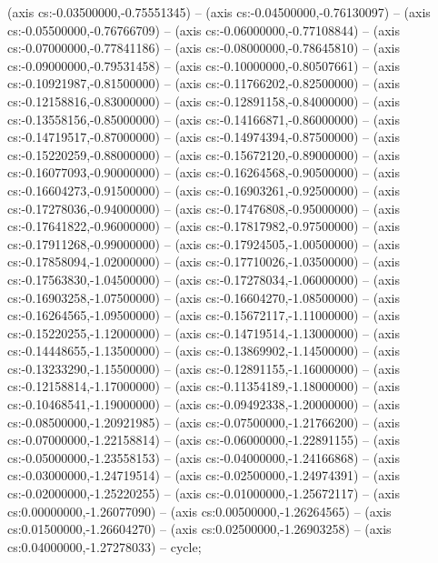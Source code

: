 (axis cs:-0.03500000,-0.75551345) -- (axis cs:-0.04500000,-0.76130097) -- (axis cs:-0.05500000,-0.76766709) -- (axis cs:-0.06000000,-0.77108844) -- (axis cs:-0.07000000,-0.77841186) -- (axis cs:-0.08000000,-0.78645810) -- (axis cs:-0.09000000,-0.79531458) -- (axis cs:-0.10000000,-0.80507661) -- (axis cs:-0.10921987,-0.81500000) -- (axis cs:-0.11766202,-0.82500000) -- (axis cs:-0.12158816,-0.83000000) -- (axis cs:-0.12891158,-0.84000000) -- (axis cs:-0.13558156,-0.85000000) -- (axis cs:-0.14166871,-0.86000000) -- (axis cs:-0.14719517,-0.87000000) -- (axis cs:-0.14974394,-0.87500000) -- (axis cs:-0.15220259,-0.88000000) -- (axis cs:-0.15672120,-0.89000000) -- (axis cs:-0.16077093,-0.90000000) -- (axis cs:-0.16264568,-0.90500000) -- (axis cs:-0.16604273,-0.91500000) -- (axis cs:-0.16903261,-0.92500000) -- (axis cs:-0.17278036,-0.94000000) -- (axis cs:-0.17476808,-0.95000000) -- (axis cs:-0.17641822,-0.96000000) -- (axis cs:-0.17817982,-0.97500000) -- (axis cs:-0.17911268,-0.99000000) -- (axis cs:-0.17924505,-1.00500000) -- (axis cs:-0.17858094,-1.02000000) -- (axis cs:-0.17710026,-1.03500000) -- (axis cs:-0.17563830,-1.04500000) -- (axis cs:-0.17278034,-1.06000000) -- (axis cs:-0.16903258,-1.07500000) -- (axis cs:-0.16604270,-1.08500000) -- (axis cs:-0.16264565,-1.09500000) -- (axis cs:-0.15672117,-1.11000000) -- (axis cs:-0.15220255,-1.12000000) -- (axis cs:-0.14719514,-1.13000000) -- (axis cs:-0.14448655,-1.13500000) -- (axis cs:-0.13869902,-1.14500000) -- (axis cs:-0.13233290,-1.15500000) -- (axis cs:-0.12891155,-1.16000000) -- (axis cs:-0.12158814,-1.17000000) -- (axis cs:-0.11354189,-1.18000000) -- (axis cs:-0.10468541,-1.19000000) -- (axis cs:-0.09492338,-1.20000000) -- (axis cs:-0.08500000,-1.20921985) -- (axis cs:-0.07500000,-1.21766200) -- (axis cs:-0.07000000,-1.22158814) -- (axis cs:-0.06000000,-1.22891155) -- (axis cs:-0.05000000,-1.23558153) -- (axis cs:-0.04000000,-1.24166868) -- (axis cs:-0.03000000,-1.24719514) -- (axis cs:-0.02500000,-1.24974391) -- (axis cs:-0.02000000,-1.25220255) -- (axis cs:-0.01000000,-1.25672117) -- (axis cs:0.00000000,-1.26077090) -- (axis cs:0.00500000,-1.26264565) -- (axis cs:0.01500000,-1.26604270) -- (axis cs:0.02500000,-1.26903258) -- (axis cs:0.04000000,-1.27278033) -- cycle;
